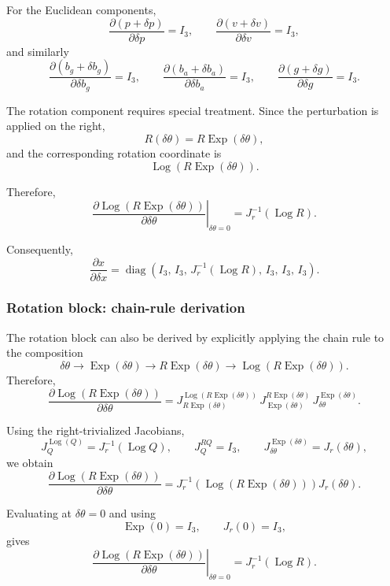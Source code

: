 \documentclass[11pt]{article}
\numberwithin{equation}{section}
\newcommand{\Exp}{\operatorname{Exp}}
\newcommand{\Log}{\operatorname{Log}}
\begin{document}
For the Euclidean components,
\[
\frac{\partial(p+\delta p)}{\partial\delta p}=I_3,
\qquad
\frac{\partial(v+\delta v)}{\partial\delta v}=I_3,
\]
and similarly
\[
\frac{\partial(b_g+\delta b_g)}{\partial\delta b_g}=I_3,
\qquad
\frac{\partial(b_a+\delta b_a)}{\partial\delta b_a}=I_3,
\qquad
\frac{\partial(g+\delta g)}{\partial\delta g}=I_3.
\]

The rotation component requires special treatment. Since the
perturbation is applied on the right,
\[
R(\delta\theta)=R\Exp(\delta\theta),
\]
and the corresponding rotation coordinate is
\[
\Log\!\left(R\Exp(\delta\theta)\right).
\]

Therefore,
\begin{equation}
\left.
\frac{
\partial
\Log\!\left(R\Exp(\delta\theta)\right)
}{
\partial\delta\theta
}
\right|_{\delta\theta=0}
=
J_r^{-1}(\Log R).
\end{equation}

Consequently,
\begin{equation}
\boxed{
\frac{\partial x}{\partial\delta x}
=
\operatorname{diag}
\left(
I_3,\,
I_3,\,
J_r^{-1}(\Log R),\,
I_3,\,
I_3,\,
I_3
\right).
}
\end{equation}


\subsubsection*{Rotation block: chain-rule derivation}

The rotation block can also be derived by explicitly applying the
chain rule to the composition
\[
\delta\theta
\longrightarrow
\Exp(\delta\theta)
\longrightarrow
R\Exp(\delta\theta)
\longrightarrow
\Log\!\left(R\Exp(\delta\theta)\right).
\]
Therefore,
\begin{equation}
\frac{\partial\Log(R\Exp(\delta\theta))}{\partial\delta\theta}
=
J^{\Log(R\Exp(\delta\theta))}_{R\Exp(\delta\theta)}
\,
J^{R\Exp(\delta\theta)}_{\Exp(\delta\theta)}
\,
J^{\Exp(\delta\theta)}_{\delta\theta}.
\end{equation}

Using the right-trivialized Jacobians,
\[
J^{\Log(Q)}_{Q}=J_r^{-1}(\Log Q),
\qquad
J^{R Q}_{Q}=I_3,
\qquad
J^{\Exp(\delta\theta)}_{\delta\theta}=J_r(\delta\theta),
\]
we obtain
\begin{equation}
\frac{\partial\Log(R\Exp(\delta\theta))}{\partial\delta\theta}
=
J_r^{-1}\!\left(\Log(R\Exp(\delta\theta))\right)
J_r(\delta\theta).
\end{equation}

Evaluating at $\delta\theta=0$ and using
\[
\Exp(0)=I_3,
\qquad
J_r(0)=I_3,
\]
gives
\begin{equation}
\boxed{
\left.
\frac{\partial\Log(R\Exp(\delta\theta))}{\partial\delta\theta}
\right|_{\delta\theta=0}
=
J_r^{-1}(\Log R).
}
\end{equation}
\end{document}
